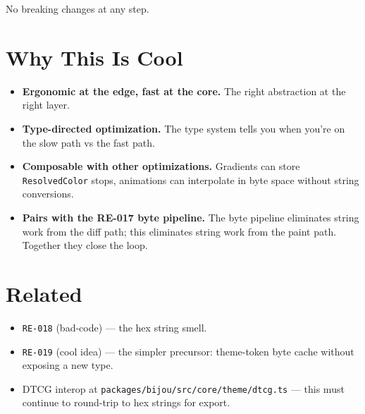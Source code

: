 No breaking changes at any step.

\section{Why This Is Cool}\label{record-370-why-this-is-cool}

\begin{itemize}
\tightlist
\item
  \textbf{Ergonomic at the edge, fast at the core.} The right abstraction at the right layer.
\item
  \textbf{Type-directed optimization.} The type system tells you when you're on the slow path vs the fast path.
\item
  \textbf{Composable with other optimizations.} Gradients can store \texttt{R\allowbreak{}e\allowbreak{}s\allowbreak{}o\allowbreak{}l\allowbreak{}v\allowbreak{}e\allowbreak{}d\allowbreak{}C\allowbreak{}o\allowbreak{}l\allowbreak{}o\allowbreak{}r} stops, animations can interpolate in byte space without string conversions.
\item
  \textbf{Pairs with the RE-017 byte pipeline.} The byte pipeline eliminates string work from the diff path; this eliminates string work from the paint path. Together they close the loop.
\end{itemize}

\section{Related}\label{record-370-related}

\begin{itemize}
\tightlist
\item
  \texttt{R\allowbreak{}E\allowbreak{}-\allowbreak{}0\allowbreak{}1\allowbreak{}8} (bad-code) --- the hex string smell.
\item
  \texttt{R\allowbreak{}E\allowbreak{}-\allowbreak{}0\allowbreak{}1\allowbreak{}9} (cool idea) --- the simpler precursor: theme-token byte cache without exposing a new type.
\item
  DTCG interop at \texttt{p\allowbreak{}a\allowbreak{}c\allowbreak{}k\allowbreak{}a\allowbreak{}g\allowbreak{}e\allowbreak{}s\allowbreak{}/\allowbreak{}b\allowbreak{}i\allowbreak{}j\allowbreak{}o\allowbreak{}u\allowbreak{}/\allowbreak{}s\allowbreak{}r\allowbreak{}c\allowbreak{}/\allowbreak{}c\allowbreak{}o\allowbreak{}r\allowbreak{}e\allowbreak{}/\allowbreak{}t\allowbreak{}h\allowbreak{}e\allowbreak{}m\allowbreak{}e\allowbreak{}/\allowbreak{}d\allowbreak{}t\allowbreak{}c\allowbreak{}g\allowbreak{}.\allowbreak{}t\allowbreak{}s} --- this must continue to round-trip to hex strings for export.
\end{itemize}

